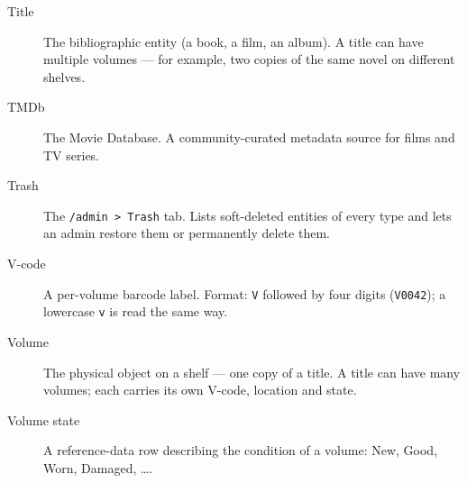 \begin{description}
  \item[Title] The bibliographic entity (a book, a film, an
        album). A title can have multiple volumes — for example,
        two copies of the same novel on different shelves.

  \item[TMDb] The Movie Database. A community-curated
        metadata source for films and TV series.

  \item[Trash] The \texttt{/admin > Trash} tab. Lists soft-deleted
        entities of every type and lets an admin restore them or
        permanently delete them.

  \item[V-code] A per-volume barcode label. Format:
        \texttt{V} followed by four digits (\texttt{V0042}); a
        lowercase \texttt{v} is read the same way.

  \item[Volume] The physical object on a shelf — one
        copy of a title. A title can have many volumes; each
        carries its own V-code, location and state.

  \item[Volume state] A reference-data row
        describing the condition of a volume: New, Good, Worn,
        Damaged, \dots.

\end{description}
